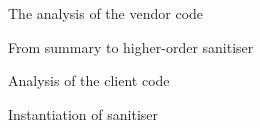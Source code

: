 The analysis of the vendor code

From summary to higher-order sanitiser

Analysis of the client code

Instantiation of sanitiser

